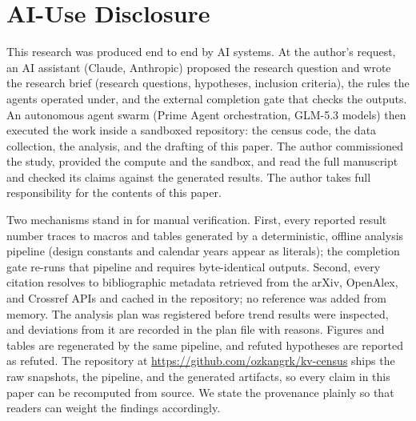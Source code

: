 \section*{AI-Use Disclosure}\label{sec:ai-disclosure}

This research was produced end to end by AI systems. At the author's request, an
AI assistant (Claude, Anthropic) proposed the research question and wrote the
research brief (research questions, hypotheses, inclusion criteria), the rules the
agents operated under, and the external completion gate that checks the outputs.
An autonomous agent swarm (Prime Agent orchestration, GLM-5.3 models) then
executed the work inside a sandboxed repository: the census code, the data
collection, the analysis, and the drafting of this paper. The author commissioned
the study, provided the compute and the sandbox, and
read the full manuscript and checked its claims against the generated results. The author takes
full responsibility for the contents of this paper.

Two mechanisms stand in for manual verification. First, every reported result
number traces to macros and tables generated by a deterministic, offline analysis
pipeline (design constants and calendar years appear as literals); the completion
gate re-runs that pipeline and requires byte-identical outputs. Second, every citation resolves to
bibliographic metadata retrieved from the arXiv, OpenAlex, and Crossref APIs
and cached in the repository; no reference was added from memory. The analysis
plan was registered before trend results were inspected, and deviations from it
are recorded in the plan file with reasons. Figures and tables are regenerated
by the same pipeline, and refuted hypotheses are reported as refuted. The
repository at \url{https://github.com/ozkangrk/kv-census} ships the raw snapshots, the pipeline, and the generated artifacts,
so every claim in this paper can be recomputed from source. We state the
provenance plainly so that readers can weight the findings accordingly.

